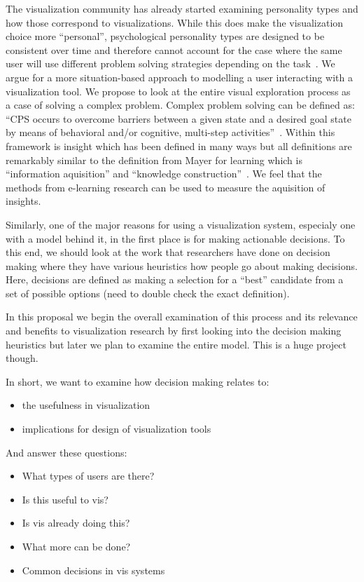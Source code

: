The visualization community has already started examining personality
types and how those correspond to visualizations. While this does make
the visualization choice more ``personal'', psychological personality
types are designed to be consistent over time and therefore cannot
account for the case where the same user will use different problem
solving strategies depending on the task~\citep{ref}. We argue for a more
situation-based approach to modelling a user interacting with a
visualization tool. We propose to look at the entire visual exploration
process as a case of solving a complex problem. Complex problem solving
can be defined as: ``CPS occurs to overcome barriers between a given
state and a desired goal state by means of behavioral and/or cognitive,
multi-step activities''~\citep{Frensch:2005}. Within this framework is
insight which has been defined in many ways but all definitions are
remarkably similar to the definition from Mayer for learning which is
``information aquisition'' and ``knowledge construction''~\citep{ref}. We
feel that the methods from e-learning research can be used to measure
the aquisition of insights.

Similarly, one of the major reasons for using a visualization system,
especialy one with a model behind it, in the first place is for making
actionable decisions. To this end, we should look at the work that
researchers have done on decision making where they have various
heuristics how people go about making decisions. Here, decisions are
defined as making a selection for a ``best'' candidate from a set of
possible options (need to double check the exact definition).

In this proposal we begin the overall examination of this process and
its relevance and benefits to visualization research by first looking
into the decision making heuristics but later we plan to examine the
entire model. This is a huge project though.

In short, we want to examine how decision making relates to:

\begin{itemize}
\tightlist
\item
  the usefulness in visualization
\item
  implications for design of visualization tools
\end{itemize}

And answer these questions:

\begin{itemize}
\tightlist
\item
  What types of users are there?
\item
  Is this useful to vis?
\item
  Is vis already doing this?
\item
  What more can be done?
\item
  Common decisions in vis systems
\end{itemize}

